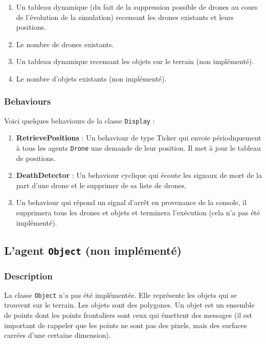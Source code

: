 \documentclass[11pt]{report}
\begin{document}
\begin{enumerate}
\item Un tableau dynamique (du fait de la suppression possible de drones au cours de l'évolution de la simulation) recensant les drones existants et leurs positions.

\item Le nombre de drones existants.

\item Un tableau dynamique recensant les objets sur le terrain (non implémenté).

\item Le nombre d'objets existants (non implémenté).

\end{enumerate}

\subsubsection{Behaviours}

Voici quelques behaviours de la classe \verb|Display| :

\begin{enumerate}
\item \textbf{RetrievePositions} : Un behaviour de type Ticker qui envoie périodiquement à tous les agents \verb|Drone| une demande de leur position. Il met à jour le tableau de positions.

\item \textbf{DeathDetector} : Un behaviour cyclique qui écoute les signaux de mort de la part d'une drone et le supprimer de sa liste de drones.

\item Un behaviour qui répond un signal d'arrêt en provenance de la console, il supprimera tous les drones et objets et terminera l'exécution (cela n'a pas été implémenté).
\end{enumerate}

\subsection{L'agent \protect\Verb+Object+ (non implémenté)}
\subsubsection{Description}

La classe \verb|Object| n'a pas été implémentée. Elle représente les objets qui se trouvent sur le terrain. Les objets sont des polygones. Un objet est un ensemble de points dont les points frontaliers sont ceux qui émettent des messages (il est important de rappeler que les points ne sont pas des pixels, mais des surfaces carrées d'une certaine dimension).
\end{document}
